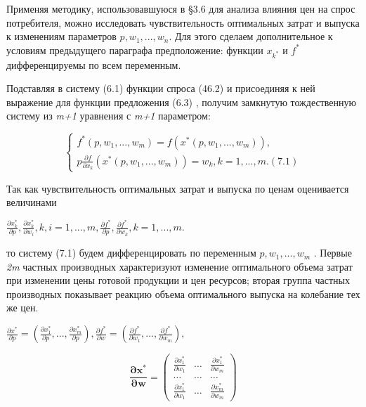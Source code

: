 \documentclass[12pt, 4paper]{book}
\begin{document}
{Применяя методику, использовавшуюся в §3.6 для анализа влияния цен на спрос потребителя, можно исследовать чувствительность оптимальных затрат и выпуска к изменениям параметров $p,w_1,...,w_n$. Для этого сделаем дополнительное к условиям предыдущего параграфа предположение: функции $x_{k^{*}}$ и $f^{*}$ дифференцируемы по всем переменным. 
\par

Подставляя в систему (6.1) функции спроса (46.2) и присоединяя к ней выражение для функции предложения (6.3) , получим замкнутую тождественную систему из \textit{m+1} уравнения с \textit{m+1} параметром: 
\begin{center}
$$\left\{
\begin{aligned}
f^{*}(p,w_1,...,w_m)=f(x^{*}(p,w_1,...,w_m)),\\
p \frac{\partial f}{\partial x_k}(x^{*}(p,w_1,...,w_m)) = w_k,k=1,...,m. (7.1)
\end{aligned}
\right.$$ 
\end{center}
\par

Так как чувствительность оптимальных затрат и выпуска по ценам оценивается величинами 
\begin{center}
$\frac{\partial x_{k}^{*}}{\partial p}, \frac{\partial x_{k}^{*}}{\partial w_i},k,i=1,...,m, \frac{\partial f^{*}}{\partial p}, \frac{\partial f^{*}}{\partial w_k},k=1,...,m $.
\end{center}
\par

то систему (7.1) будем дифференцировать по переменным $p,w_1,...,w_m$ . Первые \textit{2m} частных производных характеризуют изменение оптимального объема затрат при изменении цены готовой продукции и цен ресурсов; вторая группа частных производных показывает реакцию объема оптимального выпуска на колебание тех же цен. 
\par

\begin{center}
$\frac{\partial x^{*}}{\partial p}=(\frac{\partial x_{1}^{*}}{\partial p},...,\frac{\partial x_{m}^{*}}{\partial p}), \frac{\partial f^{*}}{\partial w}=(\frac{\partial f^{*}}{\partial w_1},...,\frac{\partial f^{*}}{\partial w_m}),$
\end{center}
\begin{center}
\begin{displaymath}
\mathbf{\frac{\partial x^{*}}{\partial w}} =
\left( \begin{array}{cccc}
\frac{\partial x_{1}^{*}}{\partial w_1} & \ldots & \frac{\partial x_{1}^{*}}{\partial w_{m}} \\
\ldots & \ldots & \ldots \\
\frac{\partial x_{1}^{*}}{\partial w_1} & \ldots & \frac{\partial x_{m}^{*}}{\partial w_{m}}  
\end{array} \right)
\end{displaymath}
\end{center}
\par

}
\end{document}
